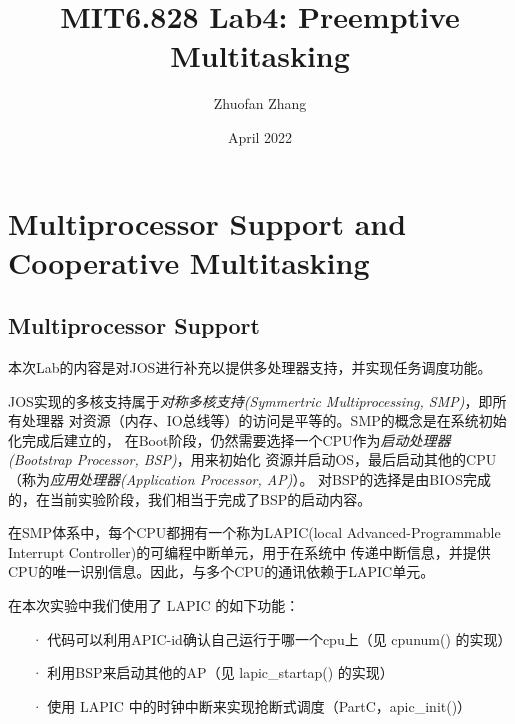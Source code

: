 \documentclass[12pt, letterpaper]{report}
\title{MIT6.828 Lab4: Preemptive Multitasking}
\author{Zhuofan Zhang}
\date{April 2022}
\begin{document}
\maketitle
\renewcommand\contentsname{\Huge Contents}
\tableofcontents{}

\newpage
{}

\chapter[\Large Multiprocessor Support and Cooperative Multitasking]{Multiprocessor Support and Cooperative Multitasking}
\section[\large Multiprocessor Support]{Multiprocessor Support}
本次Lab的内容是对JOS进行补充以提供多处理器支持，并实现任务调度功能。\par

JOS实现的多核支持属于\textsl{对称多核支持(Symmertric Multiprocessing, SMP)}，即所有处理器
对资源（内存、IO总线等）的访问是平等的。SMP的概念是在系统初始化完成后建立的，
在Boot阶段，仍然需要选择一个CPU作为\textsl{启动处理器(Bootstrap Processor, BSP)}，用来初始化
资源并启动OS，最后启动其他的CPU（称为\textsl{应用处理器(Application Processor, AP)}）。
对BSP的选择是由BIOS完成的，在当前实验阶段，我们相当于完成了BSP的启动内容。\par 

在SMP体系中，每个CPU都拥有一个称为LAPIC(local Advanced-Programmable Interrupt Controller)的可编程中断单元，用于在系统中
传递中断信息，并提供CPU的唯一识别信息。因此，与多个CPU的通讯依赖于LAPIC单元。 \par

在本次实验中我们使用了 LAPIC 的如下功能：
\begin{itemize}
    \item[·]
    代码可以利用APIC-id确认自己运行于哪一个cpu上（见 cpunum() 的实现）
    \item[·]
    利用BSP来启动其他的AP（见 lapic\_startap() 的实现）
    \item[·]
    使用 LAPIC 中的时钟中断来实现抢断式调度（PartC，apic\_init()）
\end{itemize}
\end{document}
